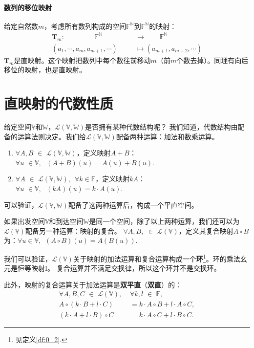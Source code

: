 \documentclass[12pt,UTF8]{ctexbook}
\begin{document}
\paragraph{数列的移位映射} 给定自然数$m$，考虑所有数列构成的空间$\mathbb{F}^{\mathbb{N}}$到$\mathbb{F}^{\mathbb{N}}$的映射：
\begin{align*}
    \mathbf{T}_m: \,\, \qquad\qquad\mathbb{F}^{\mathbb{N}}\qquad\qquad & \to \quad\quad \mathbb{F}^{\mathbb{N}}  \\
    (a_1, \cdots, a_m, a_{m+1}, \cdots ) & \mapsto (a_{m+1}, a_{m+2}, \cdots ) 
\end{align*}
$\mathbf{T}_m$是直映射。这个映射把数列中每个数往前移动$m$（前$m$个数去掉）。同理有向后移位的映射，也是直映射。

\section{直映射的代数性质}
给定空间$\mathbb{V}$和$\mathbb{W}$，$\mathcal{L}(\mathbb{V},\mathbb{W})$是否拥有某种代数结构呢？
我们知道，代数结构由配备的运算法则决定。我们给$\mathcal{L}(\mathbb{V},\mathbb{W})$配备两种运算：加法和数乘运算。
\begin{enumerate}
    \item $\forall A, B \,\, \in \,\, \mathcal{L}(\mathbb{V},\mathbb{W})$，定义映射$A+B$： $\forall u \,\, \in \mathbb{V}, \,\,\,\, (A+B)(u) = A(u) + B(u).$
    \item $\forall A \,\, \in \,\, \mathcal{L}(\mathbb{V},\mathbb{W}),  \,\,\, \forall k \in \mathbb{F}$，定义映射$kA$：$\forall u \,\, \in \mathbb{V}, \,\,\,\, (kA)(u) = k\cdot A(u).$
\end{enumerate}
可以验证，$\mathcal{L}(\mathbb{V},\mathbb{W})$配备了这两种运算后，构成一个平直空间。

如果出发空间$\mathbb{V}$和到达空间$\mathbb{W}$是同一个空间，除了以上两种运算，我们还可以为$\mathcal{L}(\mathbb{V})$配备另一种运算：映射的复合。
$\forall A, B, \,\, \in \,\, \mathcal{L}(\mathbb{V})$，定义其复合映射$A\circ B$为：$\forall u \in \mathbb{V}, \,\,\, (A\circ B)(u) = A(B(u)).$

我们可以验证，$\mathcal{L}(\mathbb{V})$关于映射的加法运算和复合运算构成一个\textbf{环}\footnote{见定义\ref{df:0_2}.}。环的乘法幺元是恒等映射$\mathrm{I}$。
复合运算并不满足交换律，所以这个环并不是交换环。

此外，映射的复合运算关于加法运算是\textbf{双平直}（\textbf{双直}）的：
\begin{align*}
    \forall A, B, C \,\, \in \,\, \mathcal{L}(\mathbb{V}), \,\, &\forall k, l \,\, \in \,\, \mathbb{F},  \\
    A\circ(k\cdot B+l\cdot C) &= k\cdot A\circ B + l\cdot A\circ C,  \\
    (k\cdot A+l\cdot B)\circ C &= k\cdot A\circ C + l\cdot B\circ C. 
\end{align*}
\end{document}
